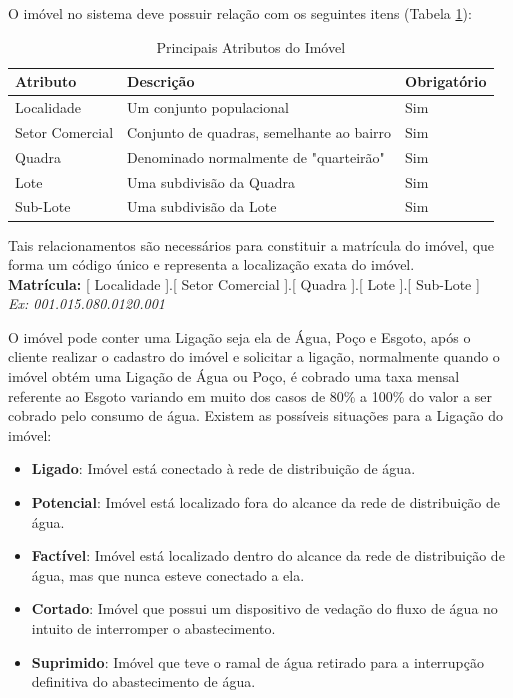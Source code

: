 O imóvel no sistema deve possuir relação com os seguintes itens (Tabela \ref{tabela:atributosImovel}):
\begin{table}[H]
	\center
	\footnotesize
	\caption{Principais Atributos do Imóvel}
	\label{tabela:atributosImovel}
	\begin{tabular}{|p{3cm}|p{7cm}|p{2.5cm}|} \hline
		\textbf{Atributo} 	& \textbf{Descrição}						& \textbf{Obrigatório}  \\ \hline
		Localidade 			& Um conjunto populacional					& Sim \\	\hline
		Setor Comercial 	& Conjunto de quadras, semelhante ao bairro & Sim \\ 	\hline
		Quadra 				& Denominado normalmente de "quarteirão" 	& Sim \\ 	\hline			
		Lote 				&  Uma subdivisão da Quadra 				& Sim \\ 	\hline
		Sub-Lote 			&  Uma subdivisão da Lote 					& Sim \\ 	\hline
	\end{tabular}
\end{table}


Tais relacionamentos são necessários para constituir a matrícula do imóvel, que forma um código único e representa a localização exata do imóvel.\\
\textbf{Matrícula:} [ Localidade ].[ Setor Comercial ].[ Quadra ].[ Lote ].[ Sub-Lote ]  \\
\textit{Ex: 001.015.080.0120.001}

O imóvel pode conter uma Ligação seja ela de Água, Poço e Esgoto, após o cliente realizar o cadastro do imóvel e solicitar a ligação, normalmente quando o imóvel obtém uma Ligação de Água ou Poço, é cobrado uma taxa mensal referente ao Esgoto variando em muito dos casos de 80\% a 100\% do valor a ser cobrado pelo consumo de água. Existem as possíveis situações para a Ligação do imóvel:
\begin{itemize}
	\item \textbf{Ligado}: Imóvel está conectado à rede de distribuição de água.
	\item \textbf{Potencial}: Imóvel está localizado fora do alcance da rede de distribuição de água.
	\item \textbf{Factível}: Imóvel está localizado dentro do alcance da rede de distribuição de água, mas que nunca esteve conectado a ela.
	\item \textbf{Cortado}: Imóvel que possui um dispositivo de vedação do fluxo de água no intuito de interromper o abastecimento.
	\item \textbf{Suprimido}: Imóvel que teve o ramal de água retirado para a interrupção definitiva do abastecimento de água.	
\end{itemize}

